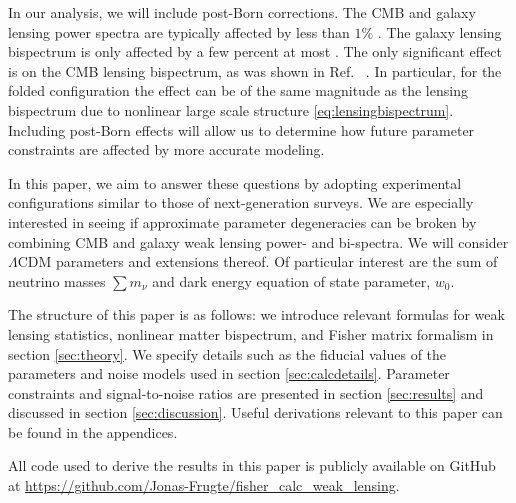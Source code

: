 \documentclass[11pt]{article} %
\begin{document}
In our analysis, we will include post-Born corrections. The CMB and galaxy lensing power spectra are typically affected by less than $1\%$ \cite{postborn_pratten_lewis, galpostbornlpscorr}. The galaxy lensing bispectrum is only affected by a few percent at most \cite{galpostbornlbscorr}. The only significant effect is on the CMB lensing bispectrum, as was shown in Ref.~ \cite{postborn_pratten_lewis}. In particular, for the folded configuration the effect can be of the same magnitude as the lensing bispectrum due to nonlinear large scale structure \eqref{eq:lensingbispectrum}. Including post-Born effects  will allow us to determine how future parameter constraints are affected by more accurate modeling. 

In this paper, we aim to answer these questions by adopting experimental configurations similar to those of next-generation surveys. We are especially interested in seeing if approximate parameter degeneracies can be broken by combining CMB and galaxy weak lensing power- and bi-spectra. 
We will consider $\Lambda$CDM parameters and extensions thereof. Of particular interest are the sum of neutrino masses $\sum m_\nu$ and dark energy equation of state parameter, $w_0$. 

 

The structure of this paper is as follows: we introduce relevant formulas for weak lensing statistics, nonlinear matter bispectrum, and Fisher matrix formalism in section \ref{sec:theory}. We specify details such as the fiducial values of the parameters and noise models used in section \ref{sec:calcdetails}. Parameter constraints and signal-to-noise ratios are presented in section \ref{sec:results} and discussed in section \ref{sec:discussion}. Useful derivations relevant to this paper can be found in the appendices.

All code used to derive the results in this paper is publicly available on GitHub at \url{https://github.com/Jonas-Frugte/fisher_calc_weak_lensing}.



%     
\end{document}
